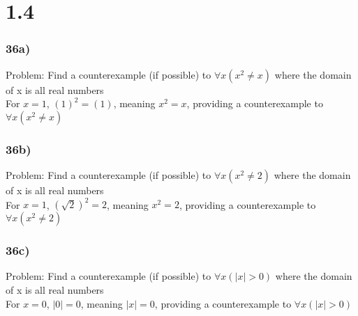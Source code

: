 \documentclass{article}
\begin{document}
\section*{1.4}
\subsubsection*{36a)}
Problem: Find a counterexample (if possible) to $\forall x(x^2 \neq x)$ where the domain of x is all real numbers\\
For $x=1$, $(1)^2=(1)$, meaning $x^2 = x$, providing a counterexample to $\forall x(x^2 \neq x)$

\subsubsection*{36b)}
Problem: Find a counterexample (if possible) to $\forall x(x^2 \neq 2)$ where the domain of x is all real numbers\\
For $x=1$, $(\sqrt{2})^2=2$, meaning $x^2=2$, providing a counterexample to $\forall x(x^2 \neq 2)$

\subsubsection*{36c)}
Problem: Find a counterexample (if possible) to $\forall x(|x| > 0)$ where the domain of x is all real numbers\\
For $x=0$, $|0| = 0$, meaning $|x| = 0$, providing a counterexample to $\forall x(|x| > 0)$
\end{document}
